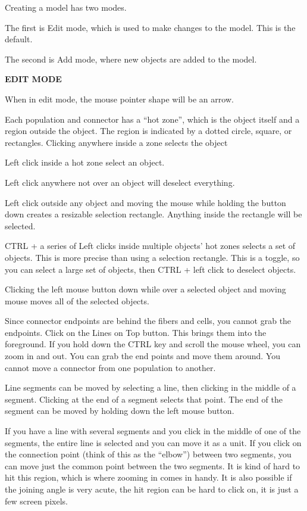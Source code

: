\documentclass[12pt,openany,oneside]{book}
\newcommand{\inquotes}[1]{{{``#1''}}}
\begin{document}
Creating a model has two modes.

The first is Edit mode, which is used to make changes to the model. This
is the default.

The second is Add mode, where new objects are added to the model.

\bigskip\centerline{\textbf{EDIT MODE}}

When in edit mode, the mouse pointer shape will be an arrow.

Each population and connector has a \inquotes{hot zone},
which is the object itself and a region outside the object. The region is
indicated by a dotted circle, square, or rectangles. Clicking anywhere
inside a zone selects the object

Left click inside a hot zone select an object.

Left click anywhere not over an object will deselect everything.

Left click outside any object and moving the mouse while holding the
button down creates a resizable selection rectangle. Anything inside the
rectangle will be selected.

CTRL + a series of Left clicks inside multiple objects' hot zones selects
a set of objects. This is more precise than using a selection rectangle.
This is a toggle, so you can select a large set of objects, then CTRL +
left click to deselect objects.

Clicking the left mouse button down while over a selected object and moving
mouse moves all of the selected objects.

Since connector endpoints are behind the fibers and cells, you cannot grab
the endpoints. Click on the Lines on Top button. This brings them into the
foreground. If you hold down the CTRL key and scroll the mouse wheel, you
can zoom in and out. You can grab the end points and move them around. You
cannot move a connector from one population to another.

Line segments can be moved by selecting a line, then clicking in the
middle of a segment. Clicking at the end of a segment selects that point.
The end of the segment can be moved by holding down the left mouse button.

If you have a line with several segments and you click in the middle of one of
the segments, the entire line is selected and you can move it as a unit. If you
click on the connection point (think of this as the \inquotes{elbow}) between two
segments, you can move just the common point between the two segments. It is
kind of hard to hit this region, which is where zooming in comes in handy. It
is also possible if the joining angle is very acute, the hit region can be hard
to click on, it is just a few screen pixels.
\end{document}
